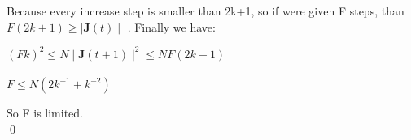 \documentclass[paper=9in:6in,pagesize=pdftex,headinclude=on,footinclude=on,10pt,bibtotoc,pointlessnumbers,normalheadings,DIV=9,twoside=false]{scrbook}
\begin{document}
\begin{text}
Because every increase step is smaller than 2k+1, so if were given F steps, than $F(2k+1) \geq \mid \textbf{J}(t) \mid $ . Finally we have:
\end{text}

\begin{center}
    $(Fk)^2 \leq N \mid \mathbf{J}(t+1) \mid ^2 \leq NF(2k+1)$ \\
    \ \\
    $F \leq N(2k^{-1} + k^{-2})$
\end{center}

\begin{text}
So F is limited. \\
\qed
\end{text}
\end{document}
